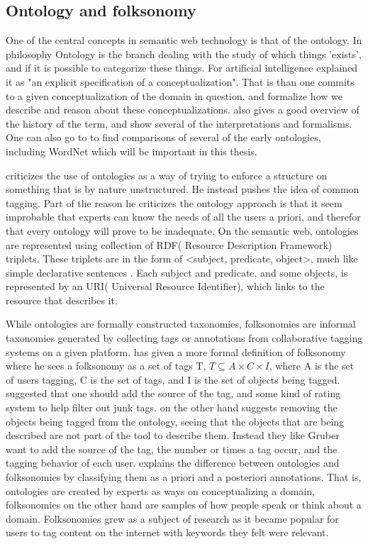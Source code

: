 \subsection{Ontology and folksonomy}
One of the central concepts in semantic web technology is that of the ontology. 
In philosophy Ontology is the branch dealing with the study of which things 'exists', and if it is possible to categorize these things. 
For artificial intelligence \citet{Gruber1993} explained it as "an explicit specification of a conceptualization". 
That is than one commits to a given conceptualization of the domain in question, and formalize how we describe and reason about these conceptualizations. 
\citet{Pretorius2004} also gives a good overview of the history of the term, and show several of the interpretations and formalisms. 
One can also go to \citet{Noy1997} to find comparisons of several of the early ontologies, including WordNet which will be important in this thesis.

\citet{Shirky2007} criticizes the use of ontologies as a way of trying to enforce a structure on something that is by nature unstructured. 
He instead pushes the idea of common tagging. 
Part of the reason he criticizes the ontology approach is that it seem improbable that experts can know the needs of all the users a priori, and therefor that every ontology will prove to be inadequate.
On the semantic web, ontologies are represented using collection of RDF( Resource Description Framework) triplets. 
These triplets are in the form of <subject, predicate, object>, much like simple declarative sentences \citep{Berners-Lee2001}. 
Each subject and predicate, and some objects, is represented by an URI( Universal Resource Identifier), which links to the resource that describes it.

While ontologies are formally constructed taxonomies, folksonomies are informal taxonomies generated by collecting tags or annotations from collaborative tagging systems on a given platform\citep{Tang2009}. 
\citet{Mika2005} has given a more formal definition of folksonomy where he sees a folksonomy as a set of tags T, 
$T \subseteq A \times C \times I$, where A is the set of users tagging, C is the set of tags, and I is the set of objects being tagged.
\citet{Gruber2007} suggested that one should add the source of the tag, and some kind of rating system to help filter out junk tags. 
\citet{Scerri2008} on the other hand suggests removing the objects being tagged from the ontology, 
seeing that the objects that are being described are not part of the tool to describe them.
Instead they like Gruber want to add the source of the tag, the number or times a tag occur, and the tagging behavior of each user.
\citet{Bang2008} explains the difference between ontologies and folksonomies by classifying them as a priori and a posteriori annotations. 
That is, ontologies are created by experts as ways on conceptualizing a domain, folksonomies on the other hand are samples of how people speak or think about a domain.
Folksonomies grew as a subject of research as it became popular for users to tag content on the internet with keywords they felt were relevant.

